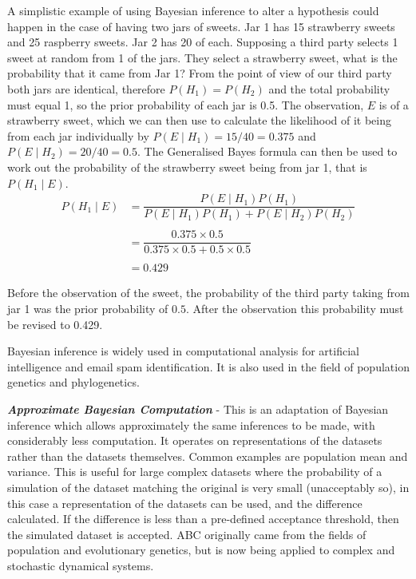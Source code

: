 A simplistic example of using Bayesian inference to alter a hypothesis could happen in the case of having two jars of sweets. Jar 1 has 15 strawberry sweets and 25 raspberry sweets. Jar 2 has 20 of each. Supposing a third party selects 1 sweet at random from 1 of the jars. They select a strawberry sweet, what is the probability that it came from Jar 1? From the point of view of our third party both jars are identical, therefore $P(H_1) = P(H_2)$ and the total probability must equal 1, so the prior probability of each jar is 0.5. The observation, $E$ is of a strawberry sweet, which we can then use to calculate the likelihood of it being from each jar individually by $P(E\mid H_1) = 15/40 = 0.375$ and $P(E\mid H_2) = 20/40 = 0.5$.
The Generalised Bayes formula can then be used to work out the probability of the strawberry sweet being from jar 1, that is $P(H_1\mid E)$.\\
\begin{align}
\nonumber
P(H_1\mid E) & = \dfrac{P(E\mid H_1)P(H_1)}{P(E\mid H_1)P(H_1) + P(E\mid H_2)P(H_2)}\\
\nonumber \\
\nonumber
& = \dfrac{0.375 \times 0.5}{0.375 \times 0.5 + 0.5 \times 0.5}\\
\nonumber \\
& = 0.429
\end{align}

Before the observation of the sweet, the probability of the third party taking from jar 1 was the prior probability of $0.5$. After the observation this probability must be revised to 0.429.

Bayesian inference is widely used in computational analysis for artificial intelligence and email spam identification. It is also used in the field of population genetics and phylogenetics\cite{Ronquist2011}.

\textbf{\textit{Approximate Bayesian Computation}} - This is an adaptation of Bayesian inference which allows approximately the same inferences to be made, with considerably less computation. It operates on representations of the datasets rather than the datasets themselves. Common examples are population mean and variance. This is useful for large complex datasets where the probability of a simulation of the dataset matching the original is very small (unacceptably so), in this case a representation of the datasets can be used, and the difference calculated. If the difference is less than a pre-defined acceptance threshold, then the simulated dataset is accepted. ABC originally came from the fields of population and evolutionary genetics\cite{Beaumont2002}, but is now being applied to complex and stochastic dynamical systems\cite{Sisson2007,Toni2009,Beaumont2010}.

